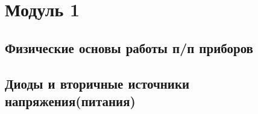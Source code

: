 \section{Модуль 1}
\subsection{Физические основы работы п/п приборов}











\subsection{Диоды и вторичные источники напряжения(питания)}











\pagebreak
